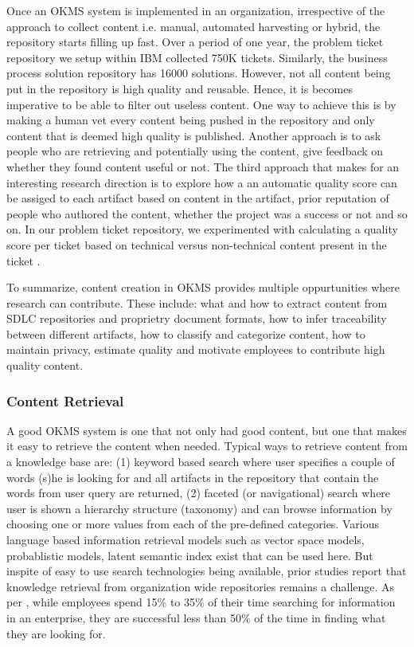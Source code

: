 Once an OKMS system is implemented in an organization, irrespective of the approach to collect content i.e. manual, automated harvesting or hybrid, the repository starts filling up fast. Over a period of one year, the problem ticket repository we setup within IBM collected 750K tickets. Similarly, the business process solution repository has 16000 solutions. However, not all content being put in the repository is high quality and reusable. Hence, it is becomes imperative to be able to filter out useless content. One way to achieve this is by making a human vet every content being pushed in the repository and only content that is deemed high quality is published. Another approach is to ask people who are retrieving and potentially using the content, give feedback on whether they found content useful or not. The third approach that makes for an interesting research direction is to explore how a an automatic quality score can be assiged to each artifact based on content in the artifact, prior reputation of people who authored the content, whether the project was a success or not and so on. In our problem ticket repository, we experimented with calculating a quality score per ticket based on technical versus non-technical content present in the ticket \cite{Majumdar:2011}.

To summarize, content creation in OKMS provides multiple oppurtunities where research can contribute. These include: what and how to extract content from SDLC repositories and proprietry document formats, how to infer traceability between different artifacts, how to classify and categorize content, how to maintain privacy, estimate quality and motivate employees to contribute high quality content. 

\subsubsection{Content Retrieval}

A good OKMS system is one that not only had good content, but one that makes it easy to retrieve the content when needed. Typical ways to retrieve content from a knowledge base are: (1) keyword based search where user specifies a couple of words (s)he is looking for and all artifacts in the repository that contain the words from user query are returned, (2) faceted (or navigational) search where user is shown a hierarchy structure (taxonomy) and can browse information by choosing one or more values from each of the pre-defined categories. Various language based information retrieval models \cite{manning2008introduction} such as vector space models, probablistic models, latent semantic index exist that can be used here. But inspite of easy to use search technologies being available, prior studies report that knowledge retrieval from organization wide repositories remains a challenge. As per \cite{idc,idc2}, while employees spend 15\% to 35\% of their time searching for information in an enterprise, they are successful less than 50\% of the time in finding what they are looking for. 

